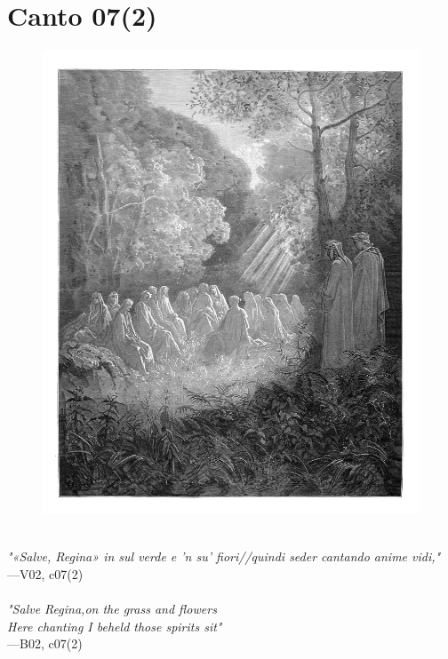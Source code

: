 \documentclass[../Dore_vision.tex]{subfiles}
\begin{document}
\newpage

\section{Canto 07(2)}

\begin{figure}[ht]
\centering
\includegraphics[height=\figsize]{illustrations/book_2/V02, c07(2).jpg}
\end{figure}

\begin{center}
\begin{minipage}{0.8\linewidth}
\textit{\\
"«Salve, Regina» in sul verde e ’n su’ fiori//quindi seder cantando anime vidi,"} \\
—V02, c07(2) \\~\\
\textit{"\textquotesingle Salve Regina,\textquotesingle  on the grass and flowers\\Here chanting I beheld those spirits sit"} \\
—B02, c07(2)
\end{minipage}
\end{center}
\end{document}
